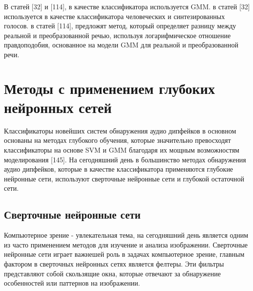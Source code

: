 В статей [32] и [114], в качестве классификатора используется GMM. в статей [32] используется в качестве классификатора человеческих и синтезированных голосов.
в статей [114], предложят метод, который определяет разницу между реальной и преобразованной речью, используя логарифмическое отношение правдоподобия, основанное на модели GMM для реальной и преобразованной речи.

\section{Методы с применением глубоких нейронных сетей}

Классификаторы новейших систем обнаружения аудио дипфейков в основном основаны на методах глубокого обучения, которые значительно превосходят классификаторы на основе SVM и GMM благодаря их мощным возможностям моделирования [145].
На сегодняшний день в большинство методах обнаружения аудио дипфейков, которые в качестве классификатора применяются глубокие нейронные сети, используют сверточные нейронные сети и глубокой остаточной сети.

\subsection{Сверточные нейронные сети}
Компьютерное зрение - увлекательная тема, на сегодняшний день является одним из часто применением методов для изучение и анализа изображении.
Сверточные нейронные сети играет важнешей роль в задачах компьютерное зрение, главным фактором в сверточных нейронных сетях является фелтеры.
Эти фильтры представляют собой скользящие окна, которые отвечают за обнаружение особенностей или паттернов на изображении.